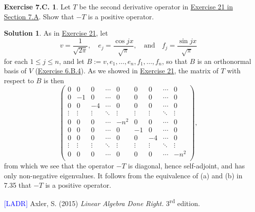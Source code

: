 \documentclass[12pt]{article}
\theoremstyle{definition}
\theoremstyle{exercise}
\newtheorem{exercise}{Exercise 7.C.}
\theoremstyle{solution}
\newtheorem*{solution}{Solution}
\newcommand{\ts}{\textsuperscript}
\newcommand{\quand}{\quad \text{and} \quad}
\begin{document}
\begin{exercise}
\label{ex:14}
    Let \( T \) be the second derivative operator in \href{https://lew98.github.io/Mathematics/LADR_Section_7_A_Exercises.pdf}{Exercise 21 in Section 7.A}. Show that \( -T \) is a positive operator.
\end{exercise}

\begin{solution}
    As in \href{https://lew98.github.io/Mathematics/LADR_Section_7_A_Exercises.pdf}{Exercise 21}, let
    \[
        v = \frac{1}{\sqrt{2 \pi}}, \quad e_j = \frac{\cos jx}{\sqrt{\pi}}, \quand f_j = \frac{\sin jx}{\sqrt{\pi}}
    \]
    for each \( 1 \leq j \leq n \), and let \( B := v, e_1, \ldots, e_n, f_1, \ldots, f_n \), so that \( B \) is an orthonormal basis of \( V \) (\href{https://lew98.github.io/Mathematics/LADR_Section_6_B_Exercises.pdf}{Exercise 6.B.4}). As we showed in \href{https://lew98.github.io/Mathematics/LADR_Section_7_A_Exercises.pdf}{Exercise 21}, the matrix of \( T \) with respect to \( B \) is then
    \[
        \begin{pmatrix}
            0 & 0 & 0 & \cdots & 0 & 0 & 0 & \cdots & 0 \\
            0 & -1 & 0 & \cdots & 0 & 0 & 0 & \cdots & 0 \\
            0 & 0 & -4 & \cdots & 0 & 0 & 0 & \cdots & 0 \\
            \vdots & \vdots & \vdots & \ddots & \vdots & \vdots & \vdots & \ddots & \vdots \\
            0 & 0 & 0 & \cdots & -n^2 & 0 & 0 & \cdots & 0 \\
            0 & 0 & 0 & \cdots & 0 & -1 & 0 & \cdots & 0 \\
            0 & 0 & 0 & \cdots & 0 & 0 & -4 & \cdots & 0 \\
            \vdots & \vdots & \vdots & \ddots & \vdots & \vdots & \vdots & \ddots & \vdots \\
            0 & 0 & 0 & \cdots & 0 & 0 & 0 & \cdots & -n^2 \\
        \end{pmatrix},
    \]
    from which we see that the operator \( -T \) is diagonal, hence self-adjoint, and has only non-negative eigenvalues. It follows from the equivalence of (a) and (b) in 7.35 that \( -T \) is a positive operator.
\end{solution}

\noindent \hrulefill

\noindent \hypertarget{ladr}{\textcolor{blue}{[LADR]} Axler, S. (2015) \textit{Linear Algebra Done Right.} 3\ts{rd} edition.}
\end{document}
